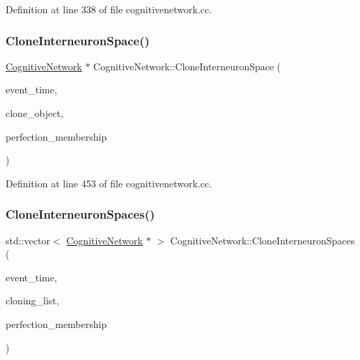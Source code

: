 Definition at line 338 of file cognitivenetwork.\+cc.

\mbox{\label{class_cognitive_network_a1eef76439fffb9daaa3edc4e3c012831}} 
\subsubsection{\texorpdfstring{Clone\+Interneuron\+Space()}{CloneInterneuronSpace()}}
{\footnotesize\ttfamily \mbox{\hyperlink{class_cognitive_network}{Cognitive\+Network}} $\ast$ Cognitive\+Network\+::\+Clone\+Interneuron\+Space (\begin{DoxyParamCaption}\item[{std\+::chrono\+::time\+\_\+point$<$ \mbox{\hyperlink{universe_8h_a0ef8d951d1ca5ab3cfaf7ab4c7a6fd80}{Clock}} $>$}]{event\+\_\+time,  }\item[{\mbox{\hyperlink{class_cognitive_network}{Cognitive\+Network}} $\ast$}]{clone\+\_\+object,  }\item[{double}]{perfection\+\_\+membership }\end{DoxyParamCaption})}



Definition at line 453 of file cognitivenetwork.\+cc.

\mbox{\label{class_cognitive_network_a5ee1d7b6df5bfe0048b4aea317c1974c}} 
\subsubsection{\texorpdfstring{Clone\+Interneuron\+Spaces()}{CloneInterneuronSpaces()}}
{\footnotesize\ttfamily std\+::vector$<$ \mbox{\hyperlink{class_cognitive_network}{Cognitive\+Network}} $\ast$ $>$ Cognitive\+Network\+::\+Clone\+Interneuron\+Spaces (\begin{DoxyParamCaption}\item[{std\+::chrono\+::time\+\_\+point$<$ \mbox{\hyperlink{universe_8h_a0ef8d951d1ca5ab3cfaf7ab4c7a6fd80}{Clock}} $>$}]{event\+\_\+time,  }\item[{std\+::vector$<$ \mbox{\hyperlink{class_cognitive_network}{Cognitive\+Network}} $\ast$$>$}]{cloning\+\_\+list,  }\item[{double}]{perfection\+\_\+membership }\end{DoxyParamCaption})}




